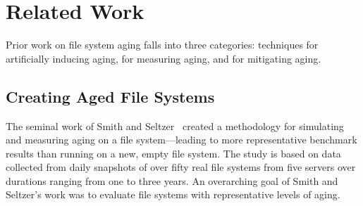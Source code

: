 \section{Related Work}\label{sec:fsa-related}
Prior work on file system aging falls into three categories:
techniques for artificially inducing aging, for
measuring aging, and for mitigating aging.




\subsection{Creating Aged File Systems}

The seminal work of Smith and Seltzer~\cite{DBLP:conf/sigmetrics/SmithS97} created a
methodology for 
simulating and measuring aging on a file system---leading
to more representative benchmark results than 
running on a new, empty file system.
The study is based on data  collected
from daily snapshots of over fifty real file systems from five servers
over durations ranging from one to three years. 
An overarching goal of Smith and Seltzer's work was to evaluate
file systems with representative levels of aging.

